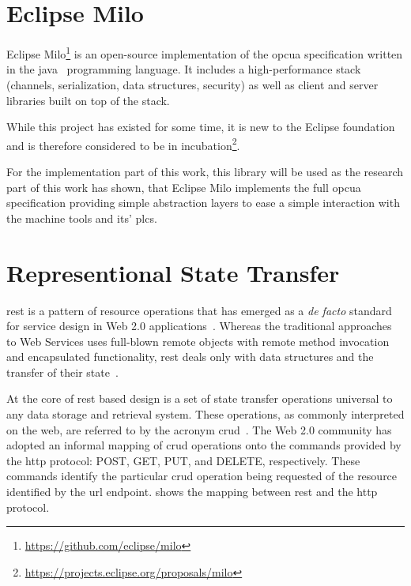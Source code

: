 \documentclass[
a4paper,
twoside,
headsepline,
cleardoublepage=empty,
parskip=half,
draft=false
]{scrbook}
\begin{document}
		\section{Eclipse Milo}\label{sec:eclipse_milo}

			Eclipse Milo\footnote{\url{https://github.com/eclipse/milo}} is an open-source implementation of the \gls{opcua} specification written in the \gls{java}~\cite{java2015} programming language. 
			It includes a high-performance stack (channels, serialization, data structures, security) as well as client and server libraries built on top of the stack.
			
			While this project has existed for some time, it is new to the Eclipse foundation and is therefore considered to be in incubation\footnote{\url{https://projects.eclipse.org/proposals/milo}}.
			
			For the implementation part of this work, this library will be used as the research part of this work has shown, that Eclipse Milo implements the full \gls{opcua} specification providing simple abstraction layers to ease a simple interaction with the machine tools and its' \gls{plc}s.

		\section{Representional State Transfer}\label{sec:rest}

			\gls{rest} is a pattern of resource operations that has emerged as a \textit{de facto} standard for service design in Web 2.0 applications~\cite{battle2008bridging}. Whereas the traditional approaches to Web Services uses full-blown remote objects with remote method invocation and encapsulated functionality, \gls{rest} deals only with data structures and the transfer of their state~\cite{fielding2000architectural}.
			
			At the core of \gls{rest} based design is a set of state transfer operations universal to any data storage and retrieval system.
			These operations, as commonly interpreted on the web, are referred to by the acronym \gls{crud}~\cite{battle2008bridging}.
			The Web 2.0 community has adopted an informal mapping of \gls{crud} operations onto the commands provided by the \gls{http} protocol: POST, GET, PUT, and DELETE, respectively. 
			These commands identify the particular \gls{crud} operation being requested of the resource identified by the \gls{url} endpoint.
			 shows the mapping between \gls{rest} and the \gls{http} protocol.
			
\end{document}
